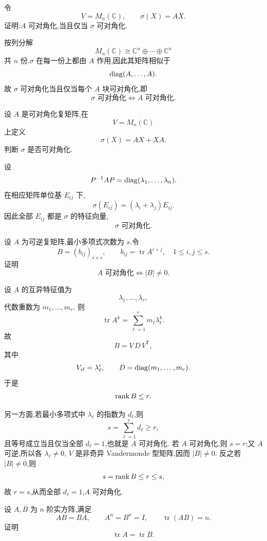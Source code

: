 \begin{example}
令
\[
V=M_n(\mathbb{C}),
\qquad
\sigma(X)=AX.
\]
证明:$A$ 可对角化,当且仅当 $\sigma$ 可对角化.
\end{example}
\exampleblank

\begin{solution}
按列分解
\[
M_n(\mathbb{C})
\cong
\mathbb{C}^n\oplus\cdots\oplus\mathbb{C}^n
\]
共 $n$ 份.$\sigma$ 在每一份上都由 $A$ 作用,因此其矩阵相似于
\[
\operatorname{diag}(A,\ldots,A).
\]
故 $\sigma$ 可对角化当且仅当每个 $A$ 块可对角化,即
\[
\boxed{\sigma\text{ 可对角化}\iff A\text{ 可对角化}.}
\]
\end{solution}


\begin{example}
设 $A$ 是可对角化复矩阵,在
\[
V=M_n(\mathbb{C})
\]
上定义
\[
\sigma(X)=AX+XA.
\]
判断 $\sigma$ 是否可对角化.
\end{example}
\exampleblank

\begin{solution}
设
\[
P^{-1}AP=\operatorname{diag}(\lambda_1,\ldots,\lambda_n).
\]
在相应矩阵单位基 $E_{ij}$ 下,
\[
\sigma(E_{ij})
=
(\lambda_i+\lambda_j)E_{ij}.
\]
因此全部 $E_{ij}$ 都是 $\sigma$ 的特征向量,
\[
\boxed{\sigma\text{ 可对角化}.}
\]
\end{solution}


\begin{example}
设 $A$ 为可逆复矩阵,最小多项式次数为 $s$.令
\[
B=(b_{ij})_{s\times s},
\qquad
b_{ij}=\operatorname{tr}A^{i+j},
\quad
1\leq i,j\leq s.
\]
证明
\[
A\text{ 可对角化}
\iff
|B|\neq0.
\]
\end{example}
\exampleblank

\begin{solution}
设 $A$ 的互异特征值为
\[
\lambda_1,\ldots,\lambda_r,
\]
代数重数为 $m_1,\ldots,m_r$.
则
\[
\operatorname{tr}A^k
=
\sum\limits_{\ell=1}^{r}m_\ell\lambda_\ell^k.
\]
故
\[
B=V\,D\,V^{\mathsf T},
\]
其中
\[
V_{i\ell}=\lambda_\ell^i,
\qquad
D=\operatorname{diag}(m_1,\ldots,m_r).
\]
于是
\[
\operatorname{rank} B\leq r.
\]

另一方面,若最小多项式中 $\lambda_\ell$ 的指数为 $d_\ell$,则
\[
s=\sum_{\ell=1}^{r}d_\ell\geq r,
\]
且等号成立当且仅当全部 $d_\ell=1$,也就是 $A$ 可对角化.
若 $A$ 可对角化,则 $s=r$;又 $A$ 可逆,所以各 $\lambda_\ell\neq0$,
$V$ 是非奇异 Vandermonde 型矩阵,因而 $|B|\neq0$.
反之若 $|B|\neq0$,则
\[
s=\operatorname{rank} B\leq r\leq s,
\]
故 $r=s$,从而全部 $d_\ell=1$,$A$ 可对角化.
\end{solution}


\begin{example}
设 $A,B$ 为 $n$ 阶实方阵,满足
\[
AB=BA,\qquad A^n=B^n=I,
\qquad
\operatorname{tr}(AB)=n.
\]
证明
\[
\operatorname{tr}A=\operatorname{tr}B.
\]
\end{example}
\exampleblank

